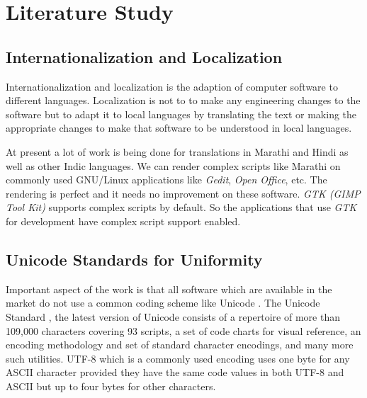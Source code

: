%

\chapter{Literature Study}
\section{Internationalization and Localization}

Internationalization and localization \cite{wiki3} is the adaption of computer software to different languages. Localization is not to to make any engineering changes to the software but to adapt it to local languages by translating the text or making the appropriate changes to make that software to be understood in local languages.    

At present a lot of work is being done for translations in Marathi and Hindi as well as other Indic languages. We can render complex scripts like Marathi on commonly used GNU/Linux applications like \textit{Gedit}, \textit{Open Office}, etc. The rendering is perfect and it needs no improvement on these software. \textit{GTK (GIMP Tool Kit)} supports complex scripts by default. So the applications that use \textit{GTK} for development have complex script support enabled.			
						
\section{Unicode Standards for Uniformity}

Important aspect of the work is that all software which are available in the market do not use a common coding scheme like Unicode \cite{wiki4}. The Unicode Standard \cite{internet1} , the latest version of Unicode consists of a repertoire of more than 109,000 characters covering 93 scripts, a set of code charts for visual reference, an encoding methodology and set of standard character encodings, and many more such utilities. UTF-8 \cite{internet2} which is a commonly used encoding uses one byte for any ASCII character provided they have the same code values in both UTF-8 and ASCII but up to four bytes for other characters.

